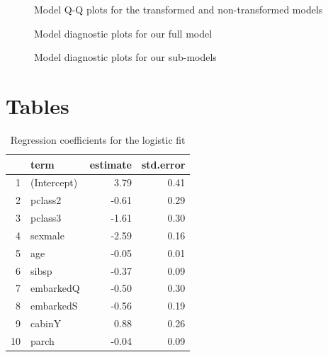 \documentclass[]{extarticle}
\begin{document}
\begin{figure}[H]
	\centering
	\caption{Model Q-Q plots for the transformed and non-transformed models}
	\label{fig:qqplots}
\end{figure}

\begin{figure}[H]
	\centering
	\caption{Model diagnostic plots for our full model}
	\label{fig:fmdiag}
\end{figure}

\begin{figure}[H]
	\centering
	\caption{Model diagnostic plots for our sub-models}
	\label{fig:smdiag}
\end{figure}

\section{Tables}
\begin{table}[H]
	\centering
	\begin{tabular}{rlrr}
		\hline
		& term & estimate & std.error \\ 
		\hline
		1 & (Intercept) & 3.79 & 0.41 \\ 
		2 & pclass2 & -0.61 & 0.29 \\ 
		3 & pclass3 & -1.61 & 0.30 \\ 
		4 & sexmale & -2.59 & 0.16 \\ 
		5 & age & -0.05 & 0.01 \\ 
		6 & sibsp & -0.37 & 0.09 \\ 
		7 & embarkedQ & -0.50 & 0.30 \\ 
		8 & embarkedS & -0.56 & 0.19 \\ 
		9 & cabinY & 0.88 & 0.26 \\ 
		10 & parch & -0.04 & 0.09 \\ 
		\hline
	\end{tabular}
\caption{Regression coefficients for the logistic fit}
\label{tab:regco}
\end{table}
\end{document}
